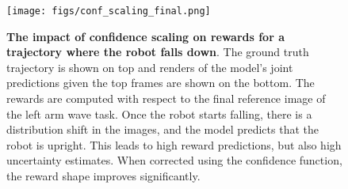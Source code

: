 \begin{figure}[h] %
    \centering
    \texttt{[image: figs/conf\_scaling\_final.png]}
    \caption{\textbf{The impact of confidence scaling on rewards for a trajectory where the robot falls down}. The ground truth trajectory is shown on top and renders of the model's joint predictions given the top frames are shown on the bottom. The rewards are computed with respect to the final reference image of the left arm wave task. Once the robot starts falling, there is a distribution shift in the images, and the model predicts that the robot is upright. This leads to high reward predictions, but also high uncertainty estimates. When corrected using the confidence function, the reward shape improves significantly.}
    \label{fig:conf_scaling}
\end{figure}
